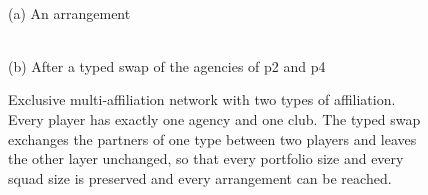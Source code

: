 \begin{figure}[t]\centering
\newcommand{\layer}[1]{\node[anchor=east,font=\footnotesize\itshape,text=black!65] at (-0.55,#1) }
\def\drawlayers{%
  \layer{2}{agencies}; \layer{0}{players}; \layer{-2}{clubs};
  \foreach \i/\x in {1/0.5,2/2.5,3/4.5} { \node[draw,rectangle,minimum size=5mm,inner sep=0,fill=black!6] (a\i) at (\x,2) {\scriptsize A\i}; }
  \foreach \i/\x in {1/0,2/1.25,3/2.5,4/3.75,5/5} { \node[draw,circle,minimum size=5mm,inner sep=0] (p\i) at (\x,0) {\scriptsize p\i}; }
  \foreach \i/\x in {1/0.5,2/2.5,3/4.5} { \node[draw,diamond,aspect=1.6,inner sep=1pt,fill=black!6] (c\i) at (\x,-2) {\scriptsize C\i}; }
  \foreach \p/\c in {1/1,2/2,3/1,4/2,5/3} { \draw[black!45,line width=0.5pt] (p\p) -- (c\c); }
}
\begin{minipage}[t]{0.49\linewidth}\centering
{}\\[1mm]
{\small (a) An arrangement}
\end{minipage}\hfill
\begin{minipage}[t]{0.49\linewidth}\centering
{}\\[1mm]
{\small (b) After a typed swap of the agencies of p2 and p4}
\end{minipage}
\caption{Exclusive multi-affiliation network with two types of affiliation. Every player has exactly one agency and one
club. The typed swap exchanges the partners of one type between two players and leaves the other layer unchanged, so that
every portfolio size and every squad size is preserved and every arrangement can be reached.\label{fig:model}}
\end{figure}
